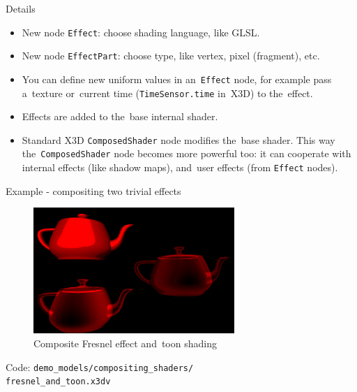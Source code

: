 \documentclass{beamer}
\begin{document}
\begin{frame}{Details}
\begin{itemize}
  \item New node \texttt{Effect}: choose shading language, like GLSL.
  \item New node \texttt{EffectPart}: choose type, like vertex, pixel (fragment), etc.
  \item You can define new uniform values in an~\texttt{Effect} node,
    for example pass a~texture or~current time (\texttt{TimeSensor.time} in~X3D)
    to the~effect.
  \item Effects are added to the~base internal shader.
  \item Standard X3D \texttt{ComposedShader} node modifies the~base shader.
    This way the~\texttt{ComposedShader} node becomes more powerful too:
    it can cooperate with internal effects (like shadow maps),
    and~user effects (from \texttt{Effect} nodes).
\end{itemize}
\end{frame}

\begin{frame}{Example - compositing two trivial effects}
\begin{figure}
  \centering
  \includegraphics[width=3.0in]{../fresnel_and_toon}
  \caption{Composite Fresnel effect and~toon shading}
\end{figure}

Code: \texttt{demo\_models/compositing\_shaders/\\fresnel\_and\_toon.x3dv}

\end{frame}
\end{document}
